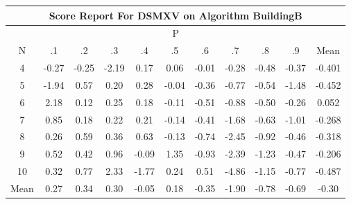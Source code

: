\documentclass[11pt,a4paper]{report}
\begin{document}
\begin{longtable}{ | c || c | c | c | c | c | c | c | c | c || c |}
\hline
\multicolumn{11}{|c|}{ Score Report For DSMXV on Algorithm BuildingB} \\
\hline
\multicolumn{11}{|c|}{ P } \\
\hline
N & .1 & .2 & .3 & .4 & .5 & .6 & .7 & .8 & .9 & Mean\\
 \hline
 \hline
 \endhead
  4 &  \cellcolor[HTML]{FFF7F7} -0.27 &  \cellcolor[HTML]{FFF7F7} -0.25 &  \cellcolor[HTML]{FFC7C7} -2.19 &  \cellcolor[HTML]{F7F7FF} 0.17 &  \cellcolor[HTML]{FFFFFF} 0.06 &  \cellcolor[HTML]{FFFFFF} -0.01 &  \cellcolor[HTML]{FFF7F7} -0.28 &  \cellcolor[HTML]{FFEFEF} -0.48 &  \cellcolor[HTML]{FFF7F7} -0.37 & -0.401 \\
  5 &  \cellcolor[HTML]{FFCFCF} -1.94 &  \cellcolor[HTML]{EFEFFF} 0.57 &  \cellcolor[HTML]{F7F7FF} 0.20 &  \cellcolor[HTML]{F7F7FF} 0.28 &  \cellcolor[HTML]{FFFFFF} -0.04 &  \cellcolor[HTML]{FFF7F7} -0.36 &  \cellcolor[HTML]{FFEFEF} -0.77 &  \cellcolor[HTML]{FFEFEF} -0.54 &  \cellcolor[HTML]{FFD7D7} -1.48 & -0.452 \\
  6 &  \cellcolor[HTML]{C7C7FF} 2.18 &  \cellcolor[HTML]{FFFFFF} 0.12 &  \cellcolor[HTML]{F7F7FF} 0.25 &  \cellcolor[HTML]{F7F7FF} 0.18 &  \cellcolor[HTML]{FFFFFF} -0.11 &  \cellcolor[HTML]{FFEFEF} -0.51 &  \cellcolor[HTML]{FFE7E7} -0.88 &  \cellcolor[HTML]{FFEFEF} -0.50 &  \cellcolor[HTML]{FFF7F7} -0.26 & 0.052 \\
  7 &  \cellcolor[HTML]{E7E7FF} 0.85 &  \cellcolor[HTML]{F7F7FF} 0.18 &  \cellcolor[HTML]{F7F7FF} 0.22 &  \cellcolor[HTML]{F7F7FF} 0.21 &  \cellcolor[HTML]{FFFFFF} -0.14 &  \cellcolor[HTML]{FFF7F7} -0.41 &  \cellcolor[HTML]{FFD7D7} -1.68 &  \cellcolor[HTML]{FFEFEF} -0.63 &  \cellcolor[HTML]{FFE7E7} -1.01 & -0.268 \\
  8 &  \cellcolor[HTML]{F7F7FF} 0.26 &  \cellcolor[HTML]{EFEFFF} 0.59 &  \cellcolor[HTML]{F7F7FF} 0.36 &  \cellcolor[HTML]{EFEFFF} 0.63 &  \cellcolor[HTML]{FFFFFF} -0.13 &  \cellcolor[HTML]{FFEFEF} -0.74 &  \cellcolor[HTML]{FFBFBF} -2.45 &  \cellcolor[HTML]{FFE7E7} -0.92 &  \cellcolor[HTML]{FFF7F7} -0.46 & -0.318 \\
  9 &  \cellcolor[HTML]{EFEFFF} 0.52 &  \cellcolor[HTML]{F7F7FF} 0.42 &  \cellcolor[HTML]{E7E7FF} 0.96 &  \cellcolor[HTML]{FFFFFF} -0.09 &  \cellcolor[HTML]{DFDFFF} 1.35 &  \cellcolor[HTML]{FFE7E7} -0.93 &  \cellcolor[HTML]{FFBFBF} -2.39 &  \cellcolor[HTML]{FFDFDF} -1.23 &  \cellcolor[HTML]{FFF7F7} -0.47 & -0.206 \\
  10 &  \cellcolor[HTML]{F7F7FF} 0.32 &  \cellcolor[HTML]{EFEFFF} 0.77 &  \cellcolor[HTML]{C7C7FF} 2.33 &  \cellcolor[HTML]{FFCFCF} -1.77 &  \cellcolor[HTML]{F7F7FF} 0.24 &  \cellcolor[HTML]{EFEFFF} 0.51 &  \cellcolor[HTML]{FF8787} -4.86 &  \cellcolor[HTML]{FFDFDF} -1.15 &  \cellcolor[HTML]{FFEFEF} -0.77 & -0.487 \\
 \hline
 \hline
Mean &  \cellcolor[HTML]{F7F7FF} 0.27 &  \cellcolor[HTML]{F7F7FF} 0.34 &  \cellcolor[HTML]{F7F7FF} 0.30 &  \cellcolor[HTML]{FFFFFF} -0.05 &  \cellcolor[HTML]{F7F7FF} 0.18 &  \cellcolor[HTML]{FFF7F7} -0.35 &  \cellcolor[HTML]{FFCFCF} -1.90 &  \cellcolor[HTML]{FFEFEF} -0.78 &  \cellcolor[HTML]{FFEFEF} -0.69 &  \cellcolor[HTML]{FFF7F7} -0.30
\end{longtable}
\end{document}
